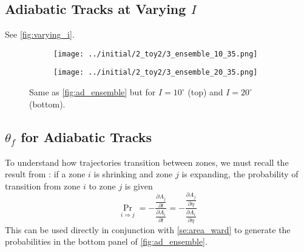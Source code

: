 \documentclass[
        fleqn,
        usenatbib,
    ]{mnras}
\newcommand*{\pd}[2]{\frac{\partial#1}{\partial#2}}
\begin{document}
\subsection{Adiabatic Tracks at Varying $I$}\label{ss:varying_I}

See \autoref{fig:varying_i}.
\begin{figure}
    \centering
    \begin{subfigure}{\columnwidth}
        \centering
        \texttt{[image: ../initial/2\_toy2/3\_ensemble\_10\_35.png]}
    \end{subfigure}
    \begin{subfigure}{\columnwidth}
        \centering
        \texttt{[image: ../initial/2\_toy2/3\_ensemble\_20\_35.png]}
    \end{subfigure}
    \caption{Same as \autoref{fig:ad_ensemble} but for $I = 10^\circ$ (top) and
    $I = 20^\circ$ (bottom).}\label{fig:varying_i}
\end{figure}

\subsection{$\theta_f$ for Adiabatic Tracks}\label{ss:app_transition}

To understand how trajectories transition between zones, we must recall the
result from \citep{henrard1982,henrard1987}: if a zone $i$ is shrinking and zone
$j$ is expanding, the probability of transition from zone $i$ to zone $j$ is
given
\begin{equation}
    \Pr_{i \Rightarrow j} = -\frac{\pd{A_j}{t}}{ \pd{A_i}{t}}
        = -\frac{\pd{A_j}{\eta}}{ \pd{A_i}{\eta}}\label{eq:henrard_hop}
\end{equation}
This can be used directly in conjunction with \autoref{se:area_ward} to generate
the probabilities in the bottom panel of \autoref{fig:ad_ensemble}.
\end{document}

